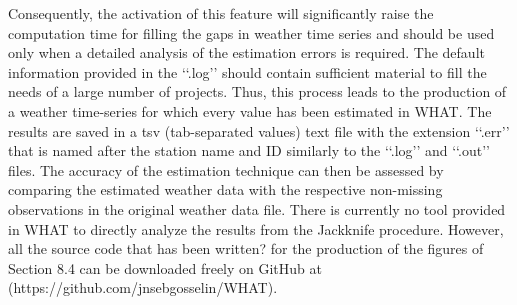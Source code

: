 \documentclass[ARTICLETHERMIC.tex]{subfiles}
\begin{document}
Consequently, the activation of this feature will significantly raise the computation time for filling the gaps in weather time series and should be used only when a detailed analysis of the estimation errors is required. The default information provided in the ‘‘.log’’ should contain sufficient material to fill the needs of a large number of projects. Thus, this process leads to the production of a weather time-series for which every value has been estimated in WHAT. The results are saved in a tsv (tab-separated values) text file with the extension ‘‘.err’’ that is named after the station name and ID similarly to the ‘‘.log’’ and ‘‘.out’’ files.
The accuracy of the estimation technique can then be assessed by comparing the estimated weather data with the respective non-missing observations in the original weather data file. There is currently no tool provided in WHAT to directly analyze the results from the Jackknife procedure. However, all the source code that has been written? for the production of the figures of Section 8.4 can be downloaded freely on GitHub at (https://github.com/jnsebgosselin/WHAT).
\end{document}
